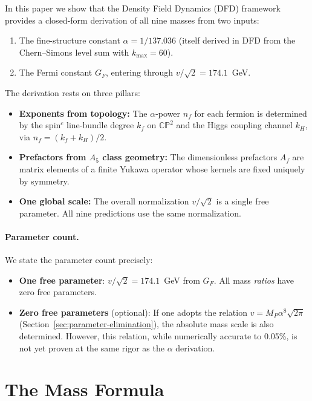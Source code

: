 \documentclass[11pt,a4paper]{article}
\newcommand{\CP}{\mathbb{CP}}
\theoremstyle{remark}
\begin{document}
In this paper we show that the Density Field Dynamics (DFD) framework provides
a closed-form derivation of all nine masses from two inputs:
\begin{enumerate}
\item The fine-structure constant $\alpha = 1/137.036$
  (itself derived in DFD from the Chern--Simons level sum with $k_{\max} = 60$).
\item The Fermi constant $G_F$, entering through $v/\sqrt{2} = 174.1$~GeV.
\end{enumerate}

The derivation rests on three pillars:
\begin{itemize}
\item \textbf{Exponents from topology:} The $\alpha$-power $n_f$ for each
  fermion is determined by the spin$^c$ line-bundle degree $k_f$ on $\CP^2$
  and the Higgs coupling channel $k_H$, via $n_f = (k_f + k_H)/2$.
\item \textbf{Prefactors from $A_5$ class geometry:} The dimensionless
  prefactors $A_f$ are matrix elements of a finite Yukawa operator whose
  kernels are fixed uniquely by symmetry.
\item \textbf{One global scale:} The overall normalization $v/\sqrt{2}$
  is a single free parameter.  All nine predictions use the same normalization.
\end{itemize}

\paragraph{Parameter count.}
We state the parameter count precisely:
\begin{itemize}
\item \textbf{One free parameter}: $v/\sqrt{2} = 174.1$~GeV from $G_F$.
  All mass \emph{ratios} have zero free parameters.
\item \textbf{Zero free parameters} (optional): If one adopts the relation
  $v = M_P\alpha^8\sqrt{2\pi}$ (Section~\ref{sec:parameter-elimination}),
  the absolute mass scale is also determined.  However, this relation,
  while numerically accurate to 0.05\%, is not yet proven at the same rigor
  as the $\alpha$ derivation.
\end{itemize}

\section{The Mass Formula}
\label{sec:master}
\end{document}
